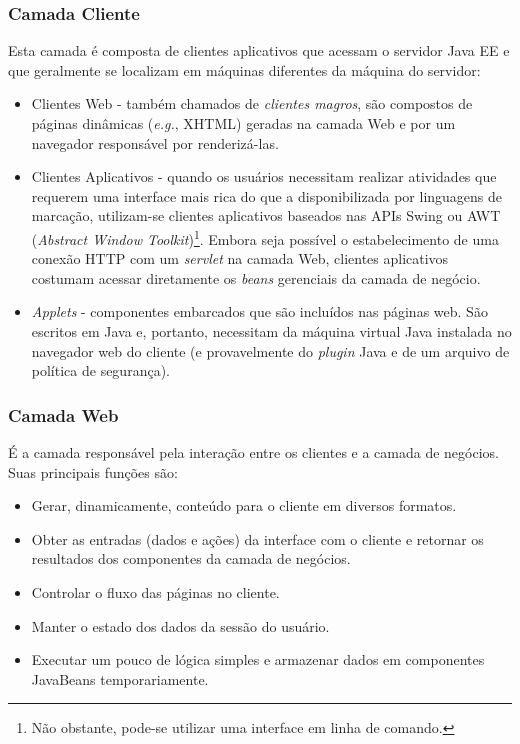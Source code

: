 \documentclass[
  10.5pt,				  %
	openright,			%
	twoside,			  %
  a5paper,
  chapter=TITLE,	%
	section=TITLE,	%
  hyphens,        %
	english,        %
	brazil          %
]{abntex2}
\begin{document}
\subsubsection{Camada Cliente}

Esta camada é composta de clientes aplicativos que acessam o servidor Java EE e que geralmente se localizam em máquinas diferentes da máquina do servidor:

\begin{itemize}
  \item Clientes Web - também chamados de \emph{clientes magros}, são compostos de páginas dinâmicas (\emph{e.g.}, XHTML) geradas na camada Web e por um navegador responsável por renderizá-las.
  \item Clientes Aplicativos - quando os usuários necessitam realizar atividades que requerem uma interface mais rica do que a disponibilizada por linguagens de marcação, utilizam-se clientes aplicativos baseados nas APIs Swing ou AWT (\emph{Abstract Window Toolkit})\footnote{Não obstante, pode-se utilizar uma interface em linha de comando.}. Embora seja possível o estabelecimento de uma conexão HTTP com um \emph{servlet} na camada Web, clientes aplicativos costumam acessar diretamente os \emph{beans} gerenciais da camada de negócio.
  \item \emph{Applets} - componentes embarcados que são incluídos nas páginas web. São escritos em Java e, portanto, necessitam da máquina virtual Java instalada no navegador web do cliente (e provavelmente do \emph{plugin} Java e de um arquivo de política de segurança).
\end{itemize}

\subsubsection{Camada Web}

É a camada responsável pela interação entre os clientes e a camada de negócios. Suas principais funções são:
\begin{itemize}
  \item Gerar, dinamicamente, conteúdo para o cliente em diversos formatos.
  \item Obter as entradas (dados e ações) da interface com o cliente e retornar os resultados dos componentes da camada de negócios.
  \item Controlar o fluxo das páginas no cliente.
  \item Manter o estado dos dados da sessão do usuário.
  \item Executar um pouco de lógica simples e armazenar dados em componentes JavaBeans temporariamente.
\end{itemize}
\end{document}
